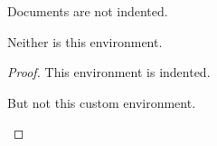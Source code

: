 \documentclass{article}
\begin{document}
Documents are not indented.

\begin{mydocument}

Neither is this environment.

\begin{proof}

  This environment is indented.

  \begin{myproof}

  But not this custom environment.

  \end{myproof}

\end{proof}

\end{mydocument}
\end{document}
